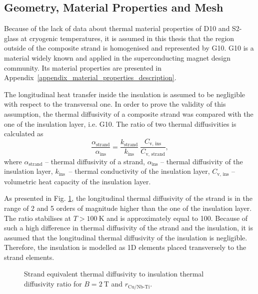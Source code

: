 
\subsection{Geometry, Material Properties and Mesh}

Because of the lack of data about thermal material properties of D10 and S2-glass at cryogenic temperatures, it is assumed in this thesis that the region outside of the composite strand is homogenised and represented by G10. G10 is a material widely known and applied in the superconducting magnet design community. Its material properties are presented in Appendix~\ref{appendix_material_properties_description}.

The longitudinal heat transfer inside the insulation is assumed to be negligible with respect to the transversal one. In order to prove the validity of this assumption, the thermal diffusivity of a composite strand was compared with the one of the insulation layer, i.e. G10. The ratio of two thermal diffusivities is calculated as
\begin{equation}
    \frac{\alpha_\text{strand}}{\alpha_\text{ins}} = \frac{k_\text{strand}}{k_\text{ins}}~\frac{C_\text{v, ins}}{C_\text{v, strand}},
    \label{eqn: diffusivity_strand_to_insulation_ratio}
\end{equation}
where $\alpha_\text{strand}$ -- thermal diffusivity of a strand, $\alpha_\text{ins}$ -- thermal diffusivity of the insulation layer, $k_\text{ins}$~-- thermal conductivity of the insulation layer, $C_\text{v, ins}$ -- volumetric heat capacity of the insulation layer. 

As presented in Fig. \ref{fig:diffusivity_strand_to_insulation_ratio}, the longitudinal thermal diffusivity of the strand is in the range of 2 and 5 orders of magnitude higher than the one of the insulation layer. The ratio stabilises at $T>100~\text{K}$ and is approximately equal to 100. Because of such a high difference in thermal diffusivity of the strand and the insulation, it is assumed that the longitudinal thermal diffusivity of the insulation is negligible. Therefore, the insulation is modelled as 1D elements placed transversely to the strand elements.

\begin{figure}[H]
\centering
    \caption{Strand equivalent thermal diffusivity to insulation thermal diffusivity ratio for $B=2~\text{T}$ and $r_\text{Cu/Nb-Ti}$.}
    \label{fig:diffusivity_strand_to_insulation_ratio}
\end{figure}

